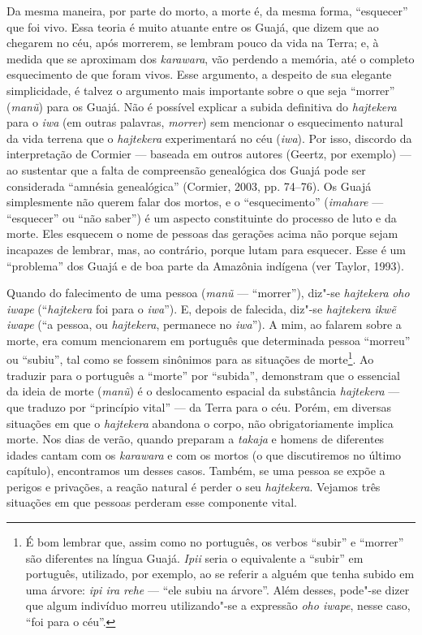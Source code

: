 Da mesma maneira, por parte do morto, a morte é, da mesma forma,
``esquecer'' que foi vivo. Essa teoria é muito atuante entre os Guajá, que
dizem que ao chegarem no céu, após morrerem, se lembram pouco da vida na
Terra; e, à medida que se aproximam dos \emph{karawara}, vão perdendo a
memória, até o completo esquecimento de que foram vivos. Esse argumento,
a despeito de sua elegante simplicidade, é talvez o argumento mais
importante sobre o que seja ``morrer'' (\emph{manũ}) para os Guajá. Não é
possível explicar a subida definitiva do \emph{hajtekera} para o
\emph{iwa} (em outras palavras, \emph{morrer}) sem mencionar o
esquecimento natural da vida terrena que o \emph{hajtekera}
experimentará no céu (\emph{iwa}). Por isso, discordo da interpretação
de Cormier --- baseada em outros autores (Geertz, por exemplo) --- ao
sustentar que a falta de compreensão genealógica dos Guajá pode ser
considerada ``amnésia genealógica'' (Cormier, 2003, pp. 74--76). Os Guajá
simplesmente não querem falar dos mortos, e o ``esquecimento''
(\emph{imahare} --- ``esquecer'' ou ``não saber'') é um aspecto constituinte
do processo de luto e da morte. Eles esquecem o nome de pessoas das
gerações acima não porque sejam incapazes de lembrar, mas, ao contrário,
porque lutam para esquecer. Esse é um ``problema'' dos Guajá e de boa
parte da Amazônia indígena (ver Taylor, 1993).

Quando do falecimento de uma pessoa (\emph{manũ} --- ``morrer''), diz"-se
\emph{hajtekera} \emph{oho iwape} (``\emph{hajtekera} foi para o
\emph{iwa}''). E, depois de falecida, diz"-se \emph{hajtekera} \emph{ikwẽ
iwape} (``a pessoa, ou \emph{hajtekera}, permanece no \emph{iwa}''). A
mim, ao falarem sobre a morte, era comum mencionarem em português que
determinada pessoa ``morreu'' ou ``subiu'', tal como se fossem sinônimos
para as situações de morte\footnote{É bom lembrar que, assim como no
  português, os verbos ``subir'' e ``morrer'' são diferentes na língua
  Guajá. \emph{Ipii} seria o equivalente a ``subir'' em português,
  utilizado, por exemplo, ao se referir a alguém que tenha subido em uma
  árvore: \emph{ipi ira rehe} --- ``ele subiu na árvore''. Além desses,
  pode"-se dizer que algum indivíduo morreu utilizando"-se a expressão
  \emph{oho iwape}, nesse caso, ``foi para o céu''.}. Ao traduzir para o
português a ``morte'' por ``subida'', demonstram que o essencial da ideia de
morte (\emph{manũ}) é o deslocamento espacial da substância
\emph{hajtekera} --- que traduzo por ``princípio vital'' --- da Terra para o
céu. Porém, em diversas situações em que o \emph{hajtekera} abandona o
corpo, não obrigatoriamente implica morte. Nos dias de verão, quando
preparam a \emph{takaja} e homens de diferentes idades cantam com os
\emph{karawara} e com os mortos (o que discutiremos no último capítulo),
encontramos um desses casos. Também, se uma pessoa se expõe a perigos e
privações, a reação natural é perder o seu \emph{hajtekera}. Vejamos
três situações em que pessoas perderam esse componente vital.

